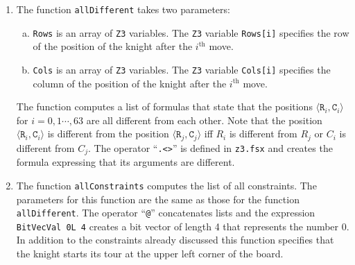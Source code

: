 \begin{enumerate}
\begin{enumerate}
            before the move. 
      \item \texttt{rowX} is a \texttt{Z3} variable that specifies the row of the position of the knight after
            the move. 
      \item \texttt{colX} is a \texttt{Z3} variable that specifies the column of the position of the knight
            after the move. 
      \end{enumerate}
      The function returns a formula that is true iff the move from position 
      $\langle \mathtt{row}, \mathtt{col} \rangle$ to the position $\langle \mathtt{rowX}, \mathtt{colX} \rangle$
      is a legal move for a knight.  In line 15 we use the functions \texttt{Or} and \texttt{And} that are
      defined in \texttt{z3.fsx}.  Both of these functions take a list of formulas as their argument.
      If \texttt{Formulas} is the list
      \\[0.2cm]
      \hspace*{1.3cm}
      $\texttt{Formulas} = [f_1; \cdots; f_n]$,
      \\[0.2cm]
      then \texttt{Or Formulas} computes the logical disjunction
      \\[0.2cm]
      \hspace*{1.3cm}
      $f_1 \vee \cdots \vee f_n$,
      \\[0.2cm]
      while \texttt{And Formulas} computes the conjunction $f_1 \wedge \cdots \wedge f_n$.
\item The function \texttt{allDifferent} takes two parameters:
      \begin{enumerate}[(a)]
      \item \texttt{Rows} is an array of \texttt{Z3} variables. The \texttt{Z3} variable \texttt{Rows[i]}
            specifies the row of the position of the knight after the $i^{\textrm{th}}$ move. 
      \item \texttt{Cols} is an array of \texttt{Z3} variables. The \texttt{Z3} variable \texttt{Cols[i]}
            specifies the column of the position of the knight after the $i^{\textrm{th}}$ move. 
      \end{enumerate}
      The function computes a list of formulas that state that the positions
      $\langle \mathtt{R}_i, \mathtt{C}_i \rangle$ for $i=0,1\cdots, 63$ are all different from each other.
      Note that the position $\langle \mathtt{R}_i, \mathtt{C}_i \rangle$ is different from the position
      $\langle \mathtt{R}_j, \mathtt{C}_j \rangle$ iff $R_i$ is different from $R_j$ or $C_i$ is different from
      $C_j$.  The operator ``\texttt{.<>}'' is defined in \texttt{z3.fsx} and creates the formula
      expressing that its arguments are different.
\item The function \texttt{allConstraints} computes the list of all constraints.
      The parameters for this function are the same as those for the function \texttt{allDifferent}.
      The operator ``\texttt{@}'' concatenates lists and the expression \texttt{BitVecVal 0L 4} creates a bit
      vector of length 4 that represents the number 0.
      In addition to the constraints already discussed this function specifies that the knight starts
      its tour at the upper left corner of the board.


\end{enumerate}
